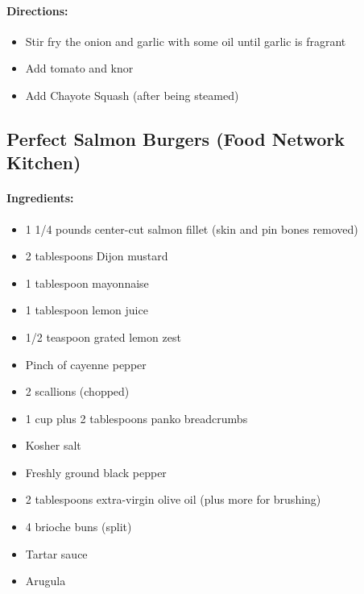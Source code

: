 \documentclass{article}
\begin{document}
\paragraph{Directions:}
\begin{itemize}
    \item Stir fry the onion and garlic with some oil until garlic is fragrant
    \item Add tomato and knor
    \item Add Chayote Squash (after being steamed)
\end{itemize}

\subsection{Perfect Salmon Burgers (Food Network Kitchen)}

\paragraph{Ingredients:}
\begin{itemize}
    \item 1 1/4 pounds center-cut salmon fillet (skin and pin bones removed)
    \item 2 tablespoons Dijon mustard
    \item 1 tablespoon mayonnaise
    \item 1 tablespoon lemon juice
    \item 1/2 teaspoon grated lemon zest
    \item Pinch of cayenne pepper
    \item 2 scallions (chopped)
    \item 1 cup plus 2 tablespoons panko breadcrumbs
    \item Kosher salt
    \item Freshly ground black pepper
    \item 2 tablespoons extra-virgin olive oil (plus more for brushing)
    \item 4 brioche buns (split)
    \item Tartar sauce
    \item Arugula
\end{itemize}
\end{document}
